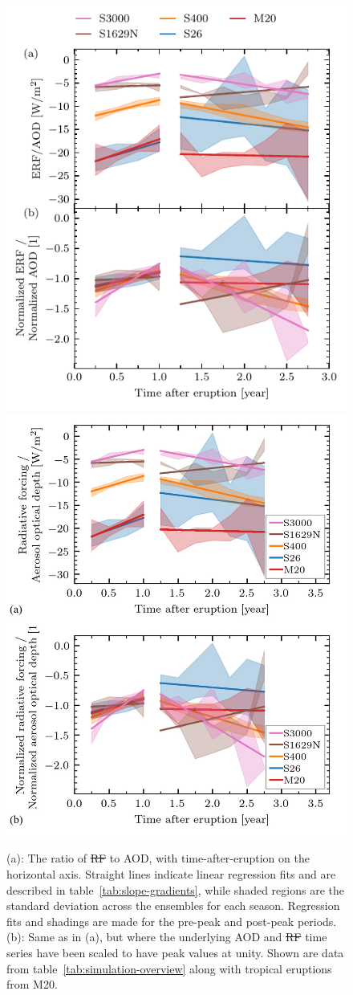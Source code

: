 \documentclass[draft]{agujournal2019}
\makeatletter
\providecommand{\DIFadd}[1]{{\protect\color{blue}\uwave{#1}}} %
\providecommand{\DIFdel}[1]{{\protect\color{red}\sout{#1}}} %
\providecommand{\DIFaddFL}[1]{\DIFadd{#1}} %
\providecommand{\DIFdelFL}[1]{\DIFdel{#1}} %
\providecommand{\DIFaddbeginFL}{} %
\providecommand{\DIFaddendFL}{} %
\providecommand{\DIFdelbeginFL}{} %
\providecommand{\DIFdelendFL}{} %
\let\sout@orig\sout %
\renewcommand{\sout}[1]{\ifmmode\text{\sout@orig{\ensuremath{#1}}}\else\sout@orig{#1}\fi} %
\makeatother
\begin{document}
  \begin{figure}
    \centering \DIFdelbeginFL %
\DIFdelendFL \DIFaddbeginFL \includegraphics[width=0.49\linewidth]{figure3}
    \includegraphics[width=0.49\linewidth]{figure3-alt}
\DIFaddendFL 

    \caption{\DIFdelbeginFL %
\DIFdelendFL \DIFaddbeginFL {}\DIFaddendFL (a): The ratio of \DIFdelbeginFL \DIFdelFL{RF }\DIFdelendFL \DIFaddbeginFL \DIFaddFL{ERF }\DIFaddendFL to AOD, with
      time-after-eruption on the horizontal axis. Straight lines indicate linear
      regression fits and are described in table~\ref{tab:slope-gradients}, while shaded
      regions are the standard deviation across the ensembles for each season.
      Regression fits and shadings are made for the pre-peak and post-peak periods. (b):
      Same as in (a), but where the underlying AOD and \DIFdelbeginFL \DIFdelFL{RF }\DIFdelendFL \DIFaddbeginFL \DIFaddFL{ERF }\DIFaddendFL time series have been scaled
      to have peak values at unity. Shown are data from
      table~\ref{tab:simulation-overview} along with tropical eruptions from
      M20.}\label{fig:3_rf_to_aod_ratios}%
  \end{figure}
\end{document}
